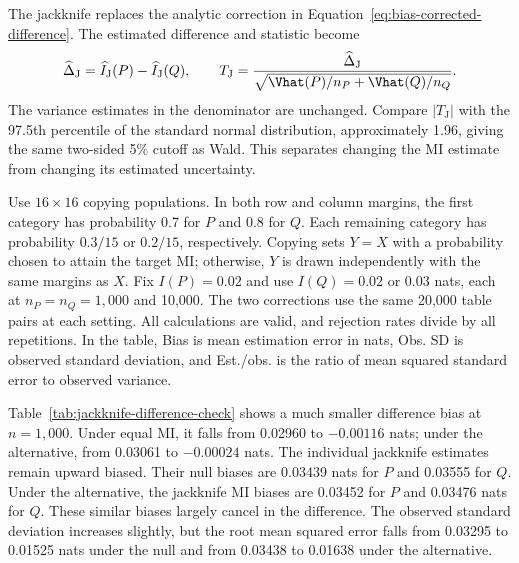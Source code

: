 The jackknife replaces the analytic correction in
Equation~\eqref{eq:bias-corrected-difference}. The estimated difference
and statistic become
\begin{equation}
 \widehat\Delta_{\mathrm J}
 =\widehat I_{\mathrm J}(P)-\widehat I_{\mathrm J}(Q),
 \qquad
 T_{\mathrm J}
 =\frac{\widehat\Delta_{\mathrm J}}
 {\sqrt{\Vhat(P)/n_P+\Vhat(Q)/n_Q}}.
 \label{eq:jackknife-fixed-se-check}
\end{equation}
The variance estimates in the denominator are unchanged. Compare
\(|T_{\mathrm J}|\) with the 97.5th percentile of the standard normal
distribution, approximately 1.96, giving the same two-sided 5\% cutoff
as Wald. This separates changing the MI estimate from changing its
estimated uncertainty.

Use \(16\times16\) copying populations. In both row and column margins,
the first category has probability 0.7 for \(P\) and 0.8 for \(Q\).
Each remaining category has probability \(0.3/15\) or \(0.2/15\),
respectively. Copying sets \(Y=X\)
with a probability chosen to attain the target MI; otherwise, \(Y\) is
drawn independently with the same margins as \(X\). Fix \(I(P)=0.02\)
and use \(I(Q)=0.02\) or 0.03 nats, each at
\(n_P=n_Q=1{,}000\) and 10,000. The two corrections use the same
20,000 table pairs at each setting. All calculations are valid, and
rejection rates divide by all repetitions. In the table, Bias is mean
estimation error in nats, Obs. SD is observed standard deviation, and
Est./obs. is the ratio of mean squared standard error to observed variance.

\begin{table}[H]
\centering
\small
\caption{Analytic and jackknife MI differences with the same standard error.}
\label{tab:jackknife-difference-check}

\end{table}

Table~\ref{tab:jackknife-difference-check} shows a much smaller difference
bias at \(n=1{,}000\). Under equal MI, it falls from 0.02960 to
\(-0.00116\) nats; under the alternative, from 0.03061 to
\(-0.00024\) nats. The individual jackknife estimates remain upward
biased. Their null biases are 0.03439 nats for \(P\) and 0.03555 for
\(Q\). Under the alternative, the jackknife MI biases are 0.03452 for
\(P\) and 0.03476 nats for \(Q\).
These similar biases largely cancel in the difference. The observed
standard deviation increases slightly, but the root mean squared error
falls from 0.03295 to 0.01525 nats under the null and from 0.03438 to
0.01638 under the alternative.

